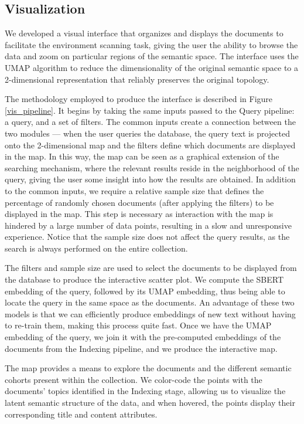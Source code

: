 \documentclass[a4paper]{article}
\begin{document}
\subsection{Visualization}
We developed a visual interface that organizes and displays the documents to facilitate the environment scanning task, giving the user the ability to browse the data and zoom on particular regions of the semantic space. The interface uses the UMAP algorithm to reduce the dimensionality of the original semantic space to a 2-dimensional representation that reliably preserves the original topology.

The methodology employed to produce the interface is described in Figure \ref{vis_pipeline}. It begins by taking the same inputs passed to the Query pipeline: a query, and a set of filters. The common inputs create a connection between the two modules — when the user queries the database, the query text is projected onto the 2-dimensional map and the filters define which documents are displayed in the map. In this way, the map can be seen as a graphical extension of the searching mechanism, where the relevant results reside in the neighborhood of the query, giving the user some insight into how the results are obtained. In addition to the common inputs, we require a relative sample size that defines the percentage of randomly chosen documents (after applying the filters) to be displayed in the map. This step is necessary as interaction with the map is hindered by a large number of data points, resulting in a slow and unresponsive experience. Notice that the sample size does not affect the query results, as the search is always performed on the entire collection.

The filters and sample size are used to select the documents to be displayed from the database to produce the interactive scatter plot. We compute the SBERT embedding of the query, followed by its UMAP embedding, thus being able to locate the query in the same space as the documents. An advantage of these two models is that we can efficiently produce embeddings of new text without having to re-train them, making this process quite fast. Once we have the UMAP embedding of the query, we join it with the pre-computed embeddings of the documents from the Indexing pipeline, and we produce the interactive map.

The map provides a means to explore the documents and the different semantic cohorts present within the collection. We color-code the points with the documents' topics identified in the Indexing stage, allowing us to visualize the latent semantic structure of the data, and when hovered, the points display their corresponding title and content attributes.
\end{document}
